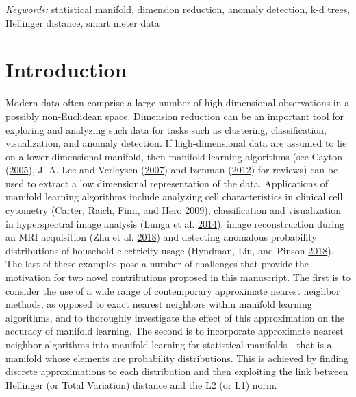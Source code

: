 \documentclass[12pt]{article}
\begin{document}
\noindent%
{\it Keywords:} statistical manifold, dimension reduction, anomaly detection, k-d trees, Hellinger distance, smart meter data
\vfill

\newpage
{} %

\newpage

\hypertarget{introduction}{%
\section{Introduction}\label{introduction}}

Modern data often comprise a large number of high-dimensional observations in a possibly non-Euclidean space. Dimension reduction can be an important tool for exploring and analyzing such data for tasks such as clustering, classification, visualization, and anomaly detection. If high-dimensional data are assumed to lie on a lower-dimensional manifold, then
manifold learning algorithms (see Cayton (\protect\hyperlink{ref-Cayton2005-dp}{2005}), J. A. Lee and Verleysen (\protect\hyperlink{ref-Lee2007-wq}{2007}) and Izenman (\protect\hyperlink{ref-Izenman2012-mx}{2012}) for reviews) can be used to extract a low dimensional representation of the data. Applications of manifold learning algorithms include analyzing cell characteristics in clinical cell cytometry (Carter, Raich, Finn, and Hero \protect\hyperlink{ref-Carter2009-ti}{2009}), classification and visualization in hyperspectral image analysis (Lunga et al. \protect\hyperlink{ref-Lunga2014-kc}{2014}), image reconstruction during an MRI acquisition (Zhu et al. \protect\hyperlink{ref-Zhu2018-jw}{2018}) and detecting anomalous probability distributions of household electricity usage (Hyndman, Liu, and Pinson \protect\hyperlink{ref-Hyndman2018-nq}{2018}). The last of these examples pose a number of challenges that provide the motivation for two novel contributions proposed in this manuscript. The first is to consider the use of a wide range of contemporary approximate nearest neighbor methods, as opposed to exact nearest neighbors within manifold learning algorithms, and to thoroughly investigate the effect of this approximation on the accuracy of manifold learning. The second is to incorporate approximate nearest neighbor algorithms into manifold learning for statistical manifolds - that is a manifold whose elements are probability distributions. This is achieved by finding discrete approximations to each distribution and then exploiting the link between Hellinger (or Total Variation) distance and the L2 (or L1) norm.
\end{document}
